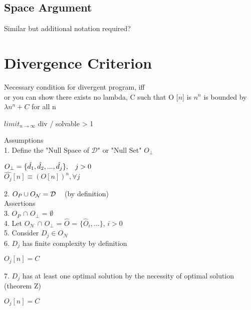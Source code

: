 \documentclass[11pt]{article}
\begin{document}
\subsection{Space Argument}
Similar but additional notation required?






\newpage
\section{Divergence Criterion}
Necessary condition for divergent program, iff\\
 or you can show there exists no lambda, C such that O $\lbrack n \rbrack$ is $n^n$ is bounded by $\lambda n^n + C$ for all n

$limit_{n \rightarrow \infty}$ div / solvable > 1

Assumptions\\
1. Define the "Null Space of $\mathcal{D}$" or "Null Set" $O_\perp$
\begin{center}
$
O_\perp = \{\hat{d_1},\hat{d_2},...,\hat{d_j}\}, \hspace{3mm} j > 0
$
\\
$
 \hat{O_j} [n] \equiv (O[n])^n, \forall j
$
\end{center}
2. $O_P \cup O_\mathcal{N} =\mathcal{D} \hspace{3mm}$ (by definition)\\

Assertions\\
3. $O_P$ $\cap$ $O_\perp$ = $\emptyset$\\
4. Let $O_\mathcal{N}$ $\cap$ $O_\perp$ = $\hat{O}$ = $\{\hat{O}_i,...\}$, $i > 0$\\
5. Consider $D_j \in O_\mathcal{N}$\\
6. $D_j$ has finite complexity by definition\\
\begin{center}
 $O_j[n] = C$
\end{center}
7. $D_j$ has at least one optimal solution by the necessity of optimal solution (theorem Z)
\begin{center}
 $O_j[n] = C$
\end{center}
\end{document}
